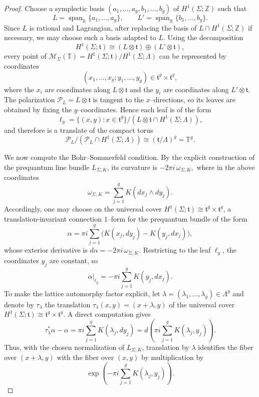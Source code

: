 \documentclass[12pt]{amsart}
\numberwithin{equation}{section}
\begin{document}
\begin{proof}
Choose a symplectic basis $(a_1,\dots,a_g,b_1,\dots,b_g)$ of $H^1(\Sigma;\mathbb Z)$ such that $$L=\operatorname{span}_{\mathbb R}\{a_1,\dots,a_g\},\qquad
L'=\operatorname{span}_{\mathbb R}\{b_1,\dots,b_g\}.$$
Since $L$ is rational and Lagrangian, after replacing the basis of $L\cap H^1(\Sigma;\mathbb Z)$ if
necessary, we may choose such a basis adapted to $L$. Using the decomposition
\[
H^1(\Sigma;\mathfrak t)\cong (L\otimes \mathfrak t)\oplus (L'\otimes \mathfrak t),
\]
every point of $\mathcal M_\Sigma(\mathbb T)=H^1(\Sigma;\mathfrak t)/H^1(\Sigma;\Lambda)$ can be represented by coordinates
\[
(x_1,\dots,x_g;y_1,\dots,y_g)\in \mathfrak t^g\times \mathfrak t^g,
\]
where the $x_i$ are coordinates along $L\otimes\mathfrak t$ and the $y_i$ are coordinates along
$L'\otimes\mathfrak t$. The polarization $\mathcal P_L=L\otimes\mathfrak t$ is tangent to the $x$--directions, so its leaves are obtained by
fixing the $y$--coordinates. Hence each leaf is of the form
\[
\ell_y=\{(x,y):x\in \mathfrak t^g\}/(L\otimes\mathfrak t\cap H^1(\Sigma;\Lambda)),
\]
and therefore is a translate of the compact torus
\[
\mathcal P_L/(\mathcal P_L\cap H^1(\Sigma;\Lambda))\cong (\mathfrak t/\Lambda)^g=\mathbb T^g.
\]

We now compute the Bohr--Sommerfeld condition. By the explicit construction of the prequantum line
bundle $L_{\Sigma,K}$, its curvature is
\(-2\pi i\,\omega_{\Sigma,K},\)
where in the above coordinates
\[
\omega_{\Sigma,K}
=
\sum_{j=1}^g K(dx_j\wedge dy_j).
\]
Accordingly, one may choose on the universal cover $H^1(\Sigma;\mathfrak t)\cong \mathfrak t^g\times\mathfrak t^g$, a translation-invariant connection $1$--form for the prequantum bundle of the form
\[
\alpha
=
\pi i\sum_{j=1}^g\bigl(K(x_j,dy_j)-K(y_j,dx_j)\bigr),
\]
whose exterior derivative is $d\alpha=-2\pi i\,\omega_{\Sigma,K}$. Restricting to the leaf $\ell_y$, the
coordinates $y_j$ are constant, so
\[
\alpha|_{\ell_y}=-\pi i\sum_{j=1}^g K(y_j,dx_j).
\]
To make the lattice automorphy factor explicit, let  $\lambda=(\lambda_1,\dots,\lambda_g)\in \Lambda^g$ and denote by \(\tau_\lambda\) the translation $\tau_\lambda(x,y)=(x+\lambda,y)$ of the universal cover \(H^1(\Sigma;\mathfrak t)\cong \mathfrak t^g\times \mathfrak t^g\).
A direct computation gives
\[
\tau_\lambda^*\alpha-\alpha
=
\pi i\sum_{j=1}^g K(\lambda_j,dy_j)
=
d\!\left(\pi i\sum_{j=1}^g K(\lambda_j,y_j)\right).
\]
Thus, with the chosen normalization of \(L_{\Sigma,K}\), translation by \(\lambda\) identifies the
fiber over \((x+\lambda,y)\) with the fiber over \((x,y)\) by multiplication by
\[
\exp\!\left(-\pi i\sum_{j=1}^g K(\lambda_j,y_j)\right).
\]


\end{proof}
\end{document}
